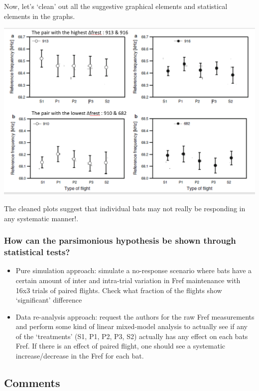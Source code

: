 \documentclass[
]{book}
\providecommand{\tightlist}{%
  \setlength{\itemsep}{0pt}\setlength{\parskip}{0pt}}
\begin{document}
Now, let's `clean' out all the suggestive graphical elements and statistical elements in the graphs.

\includegraphics{images/furusawa_etal2012_fig4_wosuggestions.PNG}

The cleaned plots suggest that individual bats may not really be responding in any systematic manner!.

\hypertarget{how-can-the-parsimonious-hypothesis-be-shown-through-statistical-tests}{%
\subsubsection{How can the parsimonious hypothesis be shown through statistical tests?}\label{how-can-the-parsimonious-hypothesis-be-shown-through-statistical-tests}}

\begin{itemize}
\tightlist
\item
  Pure simulation approach: simulate a no-response scenario where bats have a certain amount of inter and intra-trial variation in Fref maintenance with 16x3 trials of paired flights. Check what fraction of the flights show `significant' difference
\item
  Data re-analysis approach: request the authors for the raw Fref measurements and perform some kind of linear mixed-model analysis to actually see if any of the `treatments' (S1, P1, P2, P3, S2) actually has any effect on each bats Fref. If there is an effect of paired flight, one should see a systematic increase/decrease in the Fref for each bat.
\end{itemize}

\hypertarget{comments-12}{%
\subsection{Comments}\label{comments-12}}
\end{document}
